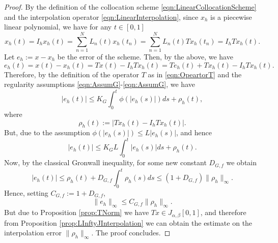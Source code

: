 \documentclass[10pt,a4paper]{amsart}
\begin{document}
\begin{proof}
	By the definition of the collocation scheme \eqref{eqn:LinearCollocationScheme} and the interpolation operator \eqref{eqn:LinearInterpolation}, since $x_h$ is a piecewise linear polynomial, we have for any $t\in[0,1]$
	\begin{equation}
		x_h(t) = I_h x_h(t) = \sum_{n=1}^N L_n(t) x_h(t_n) = \sum_{n=1}^N L_n(t) Tx_h(t_n) = I_h Tx_h (t).
	\end{equation}	
	Let $e_h := x - x_h$ be the error of the scheme. Then, by the above, we have
	\begin{equation}
		e_h(t) = x(t) - x_h(t) = Tx(t) - I_h Tx_h(t) = Te_h(t) + Tx_h(t) - I_h T x_h(t).
	\end{equation}
	Therefore, by the definition of the operator $T$ as in \eqref{eqn:OpeartorT} and the regularity assumptions \eqref{eqn:AssumG}-\eqref{eqn:AssumG}, we have
	\begin{equation}
		|e_h(t)| \leq K_G \int_0^t \phi(|e_h(s)|) ds + \rho_h(t),
	\end{equation}
	where 
	\begin{equation}
		\rho_h(t) := |Tx_h(t) - I_h T x_h(t)|. 
	\end{equation}
	But, due to the assumption $\phi(|e_h(s)|) \leq L |e_h(s)|$, and hence
	\begin{equation}
		|e_h(t)| \leq K_G L \int_0^t |e_h(s)|ds + \rho_h(t).
	\end{equation} 
	Now, by the classical Gronwall inequality, for some new constant $D_{G,f}$ we obtain
	\begin{equation}
		|e_h(t)| \leq \rho_h(t) + D_{G,f} \int_0^t \rho_h(s) ds \leq (1 + D_{G,f}) \|\rho_h\|_\infty. 
	\end{equation}
	Hence, setting $C_{G,f} := 1+ D_{G,f}$,
	\begin{equation}
		\|e_h\|_\infty \leq C_{G,f} \|\rho_h\|_\infty. 
	\end{equation}	
	But due to Proposition \ref{prop:TNorm} we have $Tx \in J_{\alpha,\beta}[0,1]$, and therefore from Proposition \ref{prop:LInftyJInterpolation} we can obtain the estimate on the interpolation error $\|\rho_h\|_\infty$. The proof concludes. 

\end{proof}
\end{document}
